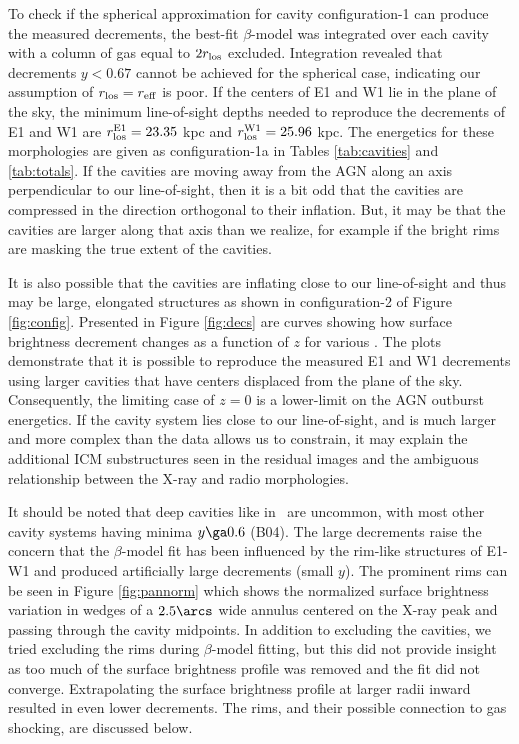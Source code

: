 \documentclass[apjpt4]{aastex}
\begin{document}
To check if the spherical approximation for cavity configuration-1 can
produce the measured decrements, the best-fit $\beta$-model was
integrated over each cavity with a column of gas equal to $2r_{\rm{los}}$
excluded. Integration revealed that decrements $y < 0.67$ cannot be
achieved for the spherical case, indicating our assumption of $r_{\rm{los}} =
r_{\rm{eff}}$ is poor. If the centers of E1 and W1 lie in the plane of the
sky, the minimum line-of-sight depths needed to reproduce the
decrements of E1 and W1 are $r_{\rm{los}}^{\rm{E1}} = 23.35$ kpc and
$r_{\rm{los}}^{\rm{W1}} = 25.96$ kpc. The energetics for these morphologies
are given as configuration-1a in Tables \ref{tab:cavities} and
\ref{tab:totals}. If the cavities are moving away from the AGN along
an axis perpendicular to our line-of-sight, then it is a bit odd that
the cavities are compressed in the direction orthogonal to their
inflation. But, it may be that the cavities are larger along that axis
than we realize, for example if the bright rims are masking the true
extent of the cavities.

It is also possible that the cavities are inflating close to our
line-of-sight and thus may be large, elongated structures as shown in
configuration-2 of Figure \ref{fig:config}. Presented in Figure
\ref{fig:decs} are curves showing how surface brightness decrement
changes as a function of $z$ for various \rlos. The plots demonstrate
that it is possible to reproduce the measured E1 and W1 decrements
using larger cavities that have centers displaced from the plane of
the sky. Consequently, the limiting case of $z = 0$ is a lower-limit
on the AGN outburst energetics. If the cavity system lies close to our
line-of-sight, and is much larger and more complex than the data
allows us to constrain, it may explain the additional ICM
substructures seen in the residual images and the ambiguous
relationship between the X-ray and radio morphologies.

It should be noted that deep cavities like in \rbs\ are uncommon, with
most other cavity systems having minima $y \ga 0.6$ (B04). The large
decrements raise the concern that the $\beta$-model fit has been
influenced by the rim-like structures of E1-W1 and produced
artificially large decrements (small $y$). The prominent rims can be
seen in Figure \ref{fig:pannorm} which shows the normalized surface
brightness variation in wedges of a $2.5\arcs$ wide annulus centered
on the X-ray peak and passing through the cavity midpoints. In
addition to excluding the cavities, we tried excluding the rims during
$\beta$-model fitting, but this did not provide insight as too much of
the surface brightness profile was removed and the fit did not
converge. Extrapolating the surface brightness profile at larger radii
inward resulted in even lower decrements. The rims, and their possible
connection to gas shocking, are discussed below.
\end{document}
